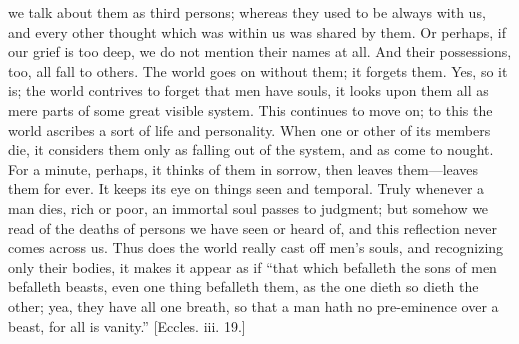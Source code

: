 we talk about them as third persons; whereas they used to be always
with us, and every other thought which was within us was shared by
them. Or perhaps, if our grief is too deep, we do not mention their
names at all. And their possessions, too, all fall to others. The
world goes on without them; it forgets them. Yes, so it is; the world
contrives to forget that men have souls, it looks upon them all as
mere parts of some great visible system. This continues to move on; to
this the world ascribes a sort of life and personality. When one or
other of its members die, it considers them only as falling out of the
system, and as come to nought. For a minute, perhaps, it thinks of
them in sorrow, then leaves them—leaves them for ever. It keeps its
eye on things seen and temporal. Truly whenever a man dies, rich or
poor, an immortal soul passes to judgment; but somehow we read of the
deaths of persons we have seen or heard of, and this reflection never
comes across us. Thus does the world really cast off men's souls, and
recognizing only their bodies, it makes it appear as if ``that
which befalleth the sons of men befalleth beasts, even one thing
befalleth them, as the one dieth so dieth the other; yea, they have
all one breath, so that a man hath no pre-eminence over a beast, for
all is vanity.'' [Eccles. iii. 19.]

